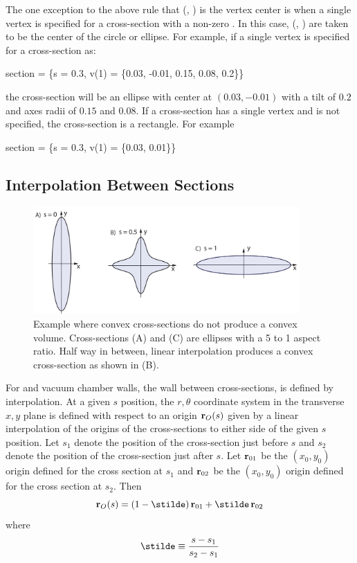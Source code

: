 The one exception to the above rule that (, ) is the vertex center is when a single
vertex  is specified for a cross-section with a non-zero . In this case,
(, ) are taken to be the center of the circle or ellipse. For example, if a single
vertex is specified for a cross-section as:
\begin{example}
  section = \{s = 0.3, v(1) = \{0.03, -0.01, 0.15, 0.08, 0.2\}\}
\end{example}
the cross-section will be an ellipse with center at $(0.03, -0.01)$ with a tilt of $0.2$ and axes
radii of $0.15$ and $0.08$. If a cross-section has a single vertex and  is not
specified, the cross-section is a rectangle. For example
\begin{example}
  section = \{s = 0.3, v(1) = \{0.03, 0.01\}\}
\end{example}

\subsection{Interpolation Between Sections}
\label{s:wall.interpolation}

\begin{figure}[tb]
  \centering
  \includegraphics[width=4in]{concave-capillary.pdf}
  \caption[Convex cross-sections do not guarantee a convex volume.]
{Example where convex cross-sections do not produce a convex volume.  Cross-sections (A) and (C) are
ellipses with a 5 to 1 aspect ratio.  Half way in between, linear interpolation produces a convex
cross-section as shown in (B).}
  \label{f:concave.capillary}
\end{figure}

For  and vacuum chamber walls, the wall between cross-sections, is defined by
interpolation. At a given $s$ position, the $r, \theta$ coordinate system in the transverse $x, y$
plane is defined with respect to an origin ${\bf r}_O(s)$ given by a linear interpolation of the
origins of the cross-sections to either side of the given $s$ position. Let $s_1$ denote the
position of the cross-section just before $s$ and $s_2$ denote the position of the cross-section
just after $s$. Let ${\bf r}_{01}$ be the $(x_0, y_0)$ origin defined for the cross section at $s_1$
and ${\bf r}_{02}$ be the $(x_0, y_0)$ origin defined for the cross section at $s_2$. Then
\begin{equation}
  \bfr_O(s) = (1 - \stilde) \, \bfr_{01} + \stilde \, \bfr_{02}
\end{equation}
where 
\begin{equation}
  \stilde \equiv \frac{s - s_1}{s_2 - s_1}
\end{equation}

